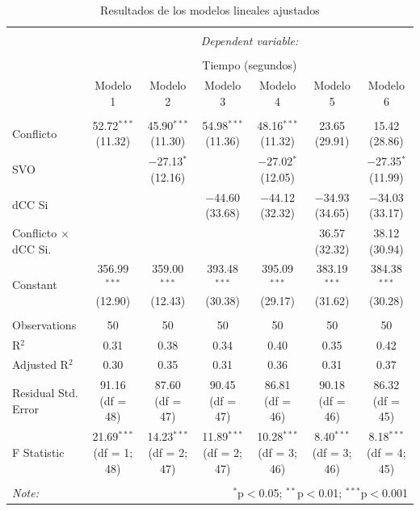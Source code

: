 \documentclass[
  spanish,
  10pt,
]{article}
\begin{document}
\begin{table}[H] \centering 
  \caption{Resultados de los modelos lineales ajustados} 
  \label{} 
\scriptsize 
\begin{tabular}{@{\extracolsep{5pt}}lcccccc} 
\\[-1.8ex]\hline 
\hline \\[-1.8ex] 
 & \multicolumn{6}{c}{\textit{Dependent variable:}} \\ 
\cline{2-7} 
\\[-1.8ex] & \multicolumn{6}{c}{Tiempo (segundos)} \\ 
 & Modelo 1 & Modelo 2 & Modelo 3 & Modelo 4 & Modelo 5 & Modelo 6 \\ 
\hline \\[-1.8ex] 
 Conflicto & 52.72$^{***}$ (11.32) & 45.90$^{***}$ (11.30) & 54.98$^{***}$ (11.36) & 48.16$^{***}$ (11.32) & 23.65 (29.91) & 15.42 (28.86) \\ 
  SVO &  & $-$27.13$^{*}$ (12.16) &  & $-$27.02$^{*}$ (12.05) &  & $-$27.35$^{*}$ (11.99) \\ 
  dCC Si &  &  & $-$44.60 (33.68) & $-$44.12 (32.32) & $-$34.93 (34.65) & $-$34.03 (33.17) \\ 
  Conflicto $\times$ dCC Si. &  &  &  &  & 36.57 (32.32) & 38.12 (30.94) \\ 
  Constant & 356.99$^{***}$ (12.90) & 359.00$^{***}$ (12.43) & 393.48$^{***}$ (30.38) & 395.09$^{***}$ (29.17) & 383.19$^{***}$ (31.62) & 384.38$^{***}$ (30.28) \\ 
 \hline \\[-1.8ex] 
Observations & 50 & 50 & 50 & 50 & 50 & 50 \\ 
R$^{2}$ & 0.31 & 0.38 & 0.34 & 0.40 & 0.35 & 0.42 \\ 
Adjusted R$^{2}$ & 0.30 & 0.35 & 0.31 & 0.36 & 0.31 & 0.37 \\ 
Residual Std. Error & 91.16 (df = 48) & 87.60 (df = 47) & 90.45 (df = 47) & 86.81 (df = 46) & 90.18 (df = 46) & 86.32 (df = 45) \\ 
F Statistic & 21.69$^{***}$ (df = 1; 48) & 14.23$^{***}$ (df = 2; 47) & 11.89$^{***}$ (df = 2; 47) & 10.28$^{***}$ (df = 3; 46) & 8.40$^{***}$ (df = 3; 46) & 8.18$^{***}$ (df = 4; 45) \\ 
\hline 
\hline \\[-1.8ex] 
\textit{Note:}  & \multicolumn{6}{r}{$^{*}$p$<$0.05; $^{**}$p$<$0.01; $^{***}$p$<$0.001} \\ 
\end{tabular} 
\end{table}
\end{document}
